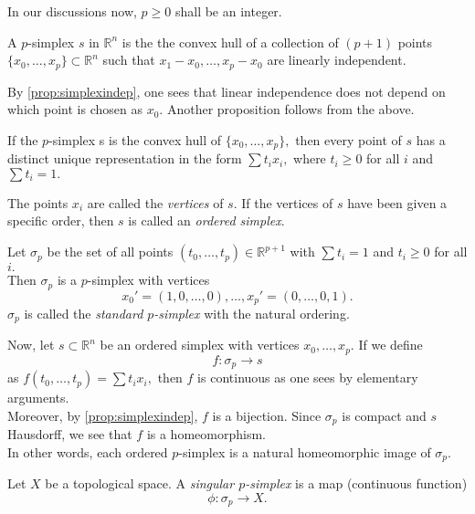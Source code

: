 \documentclass[12pt]{article}
\begin{document}
In our discussions now, $p \ge 0$ shall be an integer.

\begin{defn}[Simplex]
	A $p$-simplex $s$ in $\mathbb{R}^n$ is the the convex hull of a collection of $(p + 1)$ points $\{x_0, \ldots, x_p\} \subset \mathbb{R}^n$ such that $x_1 - x_0, \ldots, x_p - x_0$ are linearly independent.
\end{defn}

By \cref{prop:simplexindep}, one sees that linear independence does not depend on which point is chosen as $x_0.$ Another proposition follows from the above.

\begin{prop}
	If the $p$-simplex s is the convex hull of $\{x_0,\ldots, x_p\},$ then every point of $s$ has a distinct unique representation in the form $\sum t_ix_i,$ where $t_i \ge 0$ for all $i$ and $\sum t_i = 1.$
\end{prop}

The points $x_i$ are called the \emph{vertices} of $s.$ If the vertices of $s$ have been given a specific order, then $s$ is called an \emph{ordered simplex}.

\begin{defn}
	Let $\sigma_p$ be the set of all points $(t_0, \ldots, t_{p})\in\mathbb{R}^{p+1}$ with $\sum t_i = 1$ and $t_i \ge 0$ for all $i.$\\
	Then $\sigma_p$ is a $p$-simplex with vertices
	\begin{equation*} 
		x_0' = (1, 0, \ldots, 0), \ldots, x_p' = (0, \ldots, 0, 1).
	\end{equation*}
	$\sigma_p$ is called the \emph{standard $p$-simplex} with the natural ordering.
\end{defn}

Now, let $s \subset \mathbb{R}^n$ be an ordered simplex with vertices $x_0, \ldots, x_p.$ If we define
\begin{equation*} 
	f:\sigma_p\to s
\end{equation*}
as $f(t_0, \ldots, t_p) = \sum t_ix_i,$ then $f$ is continuous as one sees by elementary arguments.\\
Moreover, by \cref{prop:simplexindep}, $f$ is a bijection. Since $\sigma_p$ is compact and $s$ Hausdorff, we see that $f$ is a homeomorphism. \\
In other words, each ordered $p$-simplex is a natural homeomorphic image of $\sigma_p.$

\begin{defn}
	Let $X$ be a topological space. A \emph{singular $p$-simplex} is a map (continuous function)
	\begin{equation*} 
		\phi:\sigma_p \to X.
	\end{equation*}
\end{defn}
\end{document}
